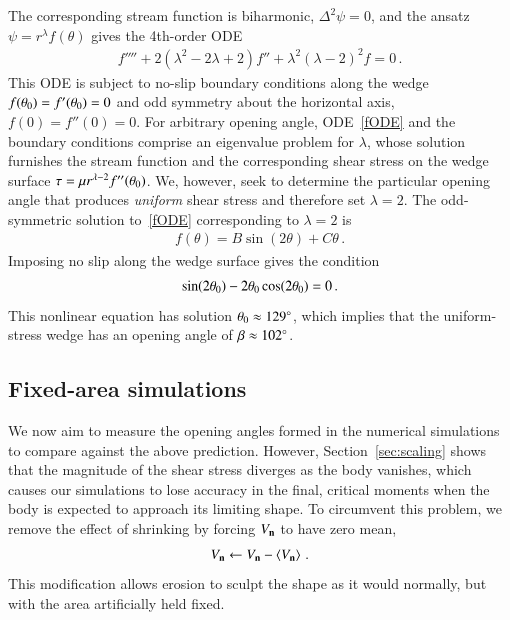 \documentclass[preprint, 10pt]{elsarticle}
\begin{document}
The corresponding stream function is biharmonic, $\Delta^2 \psi = 0$, and the ansatz $\psi = r^{\lambda}f(\theta)$ gives the 4th-order ODE~\cite{poz1997}
\begin{align}
\label{fODE}
f'''' + 2(\lambda^2 - 2 \lambda + 2)f'' + \lambda^2(\lambda-2)^2 f = 0 \, .
\end{align}
This ODE is subject to no-slip boundary conditions along the wedge $f(\theta_0) = f'(\theta_0) = 0$ and odd symmetry about the horizontal axis, $f(0) = f''(0) = 0$. For arbitrary opening angle, ODE~\eqref{fODE} and the boundary conditions comprise an eigenvalue problem for $\lambda$, whose solution furnishes the stream function and the corresponding shear stress on the wedge surface $\tau = \mu r^{\lambda-2} f''(\theta_0)$. We, however, seek to determine the particular opening angle that produces {\em uniform} shear stress and therefore set $\lambda = 2$.
The odd-symmetric solution to~\eqref{fODE} corresponding to $\lambda=2$ is
\begin{align}
  f(\theta) = B \sin (2 \theta) + C \theta \, .
\end{align}
Imposing no slip along the wedge surface gives the condition
\begin{align}
  \sin(2 \theta_0) - 2 \theta_0 \cos(2 \theta_0) = 0 \, .
\end{align}
This nonlinear equation has solution $\theta_0 \approx 129^\circ$, which implies that the uniform-stress wedge has an opening angle of $\beta \approx 102^\circ$.


\subsection{Fixed-area simulations}

We now aim to measure the opening angles formed in the numerical
simulations to compare against the above prediction. However, Section~\ref{sec:scaling} shows that the magnitude of the shear stress diverges as the body vanishes, which causes our simulations to lose accuracy in the final, critical moments when the body is expected to approach its limiting shape. To circumvent this problem, we remove the effect of shrinking by forcing $V_{\mathbf{n}}$ to have zero mean,
\begin{align}
V_{\mathbf{n}} \leftarrow V_{\mathbf{n}} - \left< V_{\mathbf{n}} \right> \, .
\end{align}
This modification allows erosion to sculpt the shape as it would normally, but with the area artificially held fixed.
\end{document}
